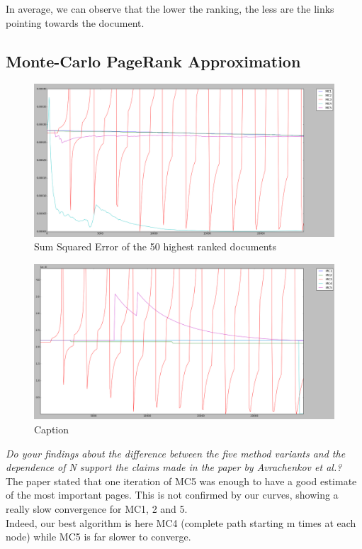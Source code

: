 \begin{itemize}
In average, we can observe that the lower the ranking, the less are the links pointing towards the document.


\subsection{Monte-Carlo PageRank Approximation}
\begin{figure}[H]
\centering
\includegraphics[width=0.8\linewidth]{img/high.png}
\caption{Sum Squared Error of the 50 highest ranked documents}
\end{figure}

\begin{figure}[H]
\centering
\includegraphics[width=0.8\linewidth]{img/low.png}
\caption{Caption}
\end{figure}


\textit{Do your findings about the difference between the five method variants and the dependence of N support the claims made in the paper by Avrachenkov et al.?}\\

The paper stated that one iteration of MC5 was enough to have a good estimate of the most important pages. This is not confirmed by our curves, showing a really slow convergence for MC1, 2 and 5.\\

Indeed, our best algorithm is here MC4 (complete path starting m times at each node) while MC5 is far slower to converge.\\


\end{itemize}
